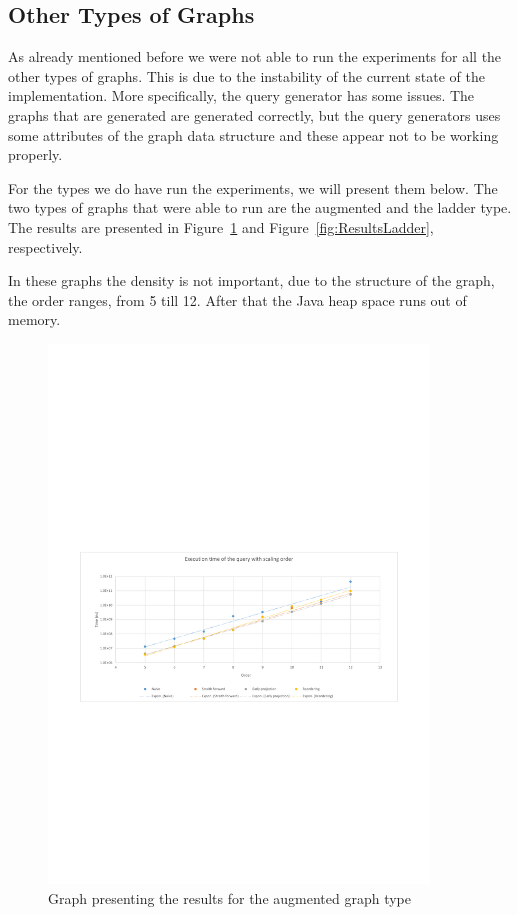 \subsection{Other Types of Graphs} \label{subsec:ResultsOtherTypes}
As already mentioned before we were not able to run the experiments for all the other types of graphs. This is due to the instability of the current state of the implementation. More specifically, the query generator has some issues. The graphs that are generated are generated correctly, but the query generators uses some attributes of the graph data structure and these appear not to be working properly. 

For the types we do have run the experiments, we will present them below. The two types of graphs that were able to run are the augmented and the ladder type. The results are presented in Figure~\ref{fig:ResultsAugmented} and Figure~\ref{fig:ResultsLadder}, respectively. 

In these graphs the density is not important, due to the structure of the graph, the order ranges, from 5 till 12. After that the Java heap space runs out of memory. 

\begin{figure}[h]
\center
	\includegraphics[width=0.9\textwidth]{figures/results_augmented}%
	\caption{Graph presenting the results for the augmented graph type}
	\label{fig:ResultsAugmented}
\end{figure}

